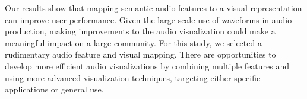 Our results show that mapping semantic audio features to a visual representation can improve user performance.  Given
the large-scale use of waveforms in audio production, making improvements to the audio visualization could make a
meaningful impact on a large community.  For this study, we selected a rudimentary audio feature and visual mapping.
There are opportunities to develop more efficient audio visualizations by combining multiple features and using more
advanced visualization techniques, targeting either specific applications or general use.



